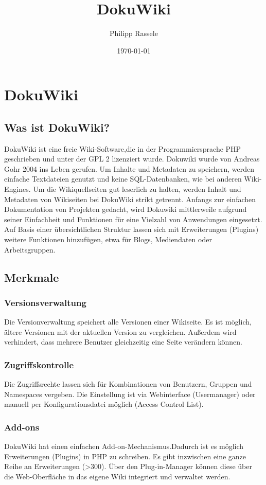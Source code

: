 \title{DokuWiki}
\author{Philipp Rassele}
\date{\today}
\maketitle

\section{DokuWiki}
\subsection{Was ist DokuWiki?}
DokuWiki ist eine freie Wiki-Software,die in der Programmiersprache PHP geschrieben und unter der GPL 2 lizenziert wurde. Dokuwiki wurde von Andreas Gohr 2004 ins Leben gerufen. Um Inhalte und Metadaten zu speichern, werden einfache Textdateien genutzt und keine SQL-Datenbanken, wie bei anderen Wiki-Engines. Um die Wikiquellseiten gut leserlich zu halten, werden Inhalt und Metadaten von Wikiseiten bei DokuWiki strikt getrennt. Anfangs zur einfachen Dokumentation von Projekten gedacht, wird Dokuwiki mittlerweile aufgrund seiner Einfachheit und Funktionen für eine Vielzahl von Anwendungen eingesetzt. Auf Basis einer übersichtlichen Struktur lassen sich mit Erweiterungen (Plugins) weitere Funktionen hinzufügen, etwa für Blogs, Mediendaten oder Arbeitsgruppen.
\subsection{Merkmale}
\subsubsection{Versionsverwaltung}
Die Versionverwaltung speichert alle Versionen einer Wikiseite. Es ist möglich, ältere Versionen mit der aktuellen Version zu vergleichen. Außerdem wird verhindert, dass mehrere Benutzer gleichzeitig eine Seite verändern können.
\subsubsection{Zugriffskontrolle}
Die Zugriffsrechte lassen sich für Kombinationen von Benutzern, Gruppen und Namespaces vergeben. Die Einstellung ist via Webinterface (Usermanager) oder manuell per Konfigurationsdatei möglich (Access Control List).
\subsubsection{Add-ons}
DokuWiki hat einen einfachen Add-on-Mechanismus.Dadurch ist es möglich Erweiterungen (Plugins) in PHP zu schreiben. Es gibt inzwischen eine ganze Reihe an Erweiterungen (>300). Über den Plug-in-Manager können diese über die Web-Oberfläche in das eigene Wiki integriert und verwaltet werden.
